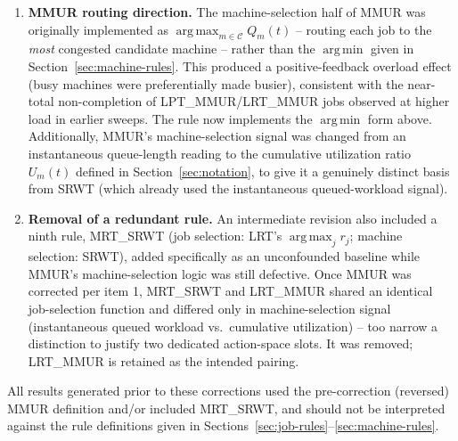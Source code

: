\documentclass[conference]{IEEEtran}
\newcommand{\argmin}{\operatorname*{arg\,min}}
\newcommand{\argmax}{\operatorname*{arg\,max}}
\begin{document}
\begin{enumerate}[leftmargin=*]
  \item \textbf{MMUR routing direction.} The machine-selection half of MMUR was
        originally implemented as $\argmax_{m \in \mathcal{C}} Q_m(t)$ -- routing
        each job to the \emph{most} congested candidate machine -- rather than the
        $\argmin$ given in Section~\ref{sec:machine-rules}. This produced a
        positive-feedback overload effect (busy machines were preferentially made
        busier), consistent with the near-total non-completion of
        LPT\_MMUR/LRT\_MMUR jobs observed at higher load in earlier sweeps. The rule
        now implements the $\argmin$ form above. Additionally, MMUR's
        machine-selection signal was changed from an instantaneous queue-length
        reading to the cumulative utilization ratio $U_m(t)$ defined in
        Section~\ref{sec:notation}, to give it a genuinely distinct basis from SRWT
        (which already used the instantaneous queued-workload signal).
  \item \textbf{Removal of a redundant rule.} An intermediate revision also included
        a ninth rule, \textsc{MRT\_SRWT} (job selection: LRT's $\argmax_j r_j$;
        machine selection: SRWT), added specifically as an unconfounded baseline
        while MMUR's machine-selection logic was still defective. Once MMUR was
        corrected per item 1, \textsc{MRT\_SRWT} and \textsc{LRT\_MMUR} shared an
        identical job-selection function and differed only in machine-selection
        signal (instantaneous queued workload vs.\ cumulative utilization) -- too
        narrow a distinction to justify two dedicated action-space slots. It was
        removed; \textsc{LRT\_MMUR} is retained as the intended pairing.
\end{enumerate}

All results generated prior to these corrections used the pre-correction (reversed)
MMUR definition and/or included \textsc{MRT\_SRWT}, and should not be interpreted
against the rule definitions given in Sections~\ref{sec:job-rules}--\ref{sec:machine-rules}.



\end{document}
